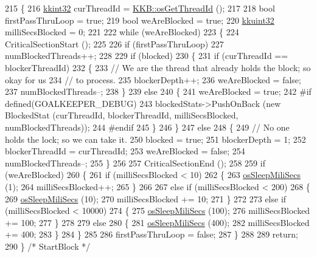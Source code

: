 \begin{DoxyCode}
215 \{
216   \hyperlink{namespace_k_k_b_a8fa4952cc84fda1de4bec1fbdd8d5b1b}{kkint32}  curThreadId = \hyperlink{namespace_k_k_b_aa1d581b15163a41037c43bdbd800d0f8}{KKB::osGetThreadId} ();
217   
218   \textcolor{keywordtype}{bool}    firstPassThruLoop = \textcolor{keyword}{true};
219   \textcolor{keywordtype}{bool}    weAreBlocked      = \textcolor{keyword}{true};
220   \hyperlink{namespace_k_k_b_af8d832f05c54994a1cce25bd5743e19a}{kkuint32}  milliSecsBlocked  = 0;
221 
222   \textcolor{keywordflow}{while}  (weAreBlocked)
223   \{
224     CriticalSectionStart ();
225 
226     \textcolor{keywordflow}{if}  (firstPassThruLoop)
227       numBlockedThreads++;
228 
229     \textcolor{keywordflow}{if}  (blocked)
230     \{
231       \textcolor{keywordflow}{if}  (curThreadId == blockerThreadId)
232       \{
233         \textcolor{comment}{// We are the thread that already holds the block;  so okay for us }
234         \textcolor{comment}{// to process.}
235         blockerDepth++;
236         weAreBlocked = \textcolor{keyword}{false};
237         numBlockedThreads--;
238       \}
239       \textcolor{keywordflow}{else}
240       \{
241         weAreBlocked = \textcolor{keyword}{true};
242 \textcolor{preprocessor}{#if  defined(GOALKEEPER\_DEBUG)}
243         blockedStats->PushOnBack (\textcolor{keyword}{new} BlockedStat (curThreadId, blockerThreadId, milliSecsBlocked, 
      numBlockedThreads));
244 \textcolor{preprocessor}{#endif}
245       \}
246     \}
247     \textcolor{keywordflow}{else}
248     \{
249       \textcolor{comment}{// No one holds the lock;  so we can take it.}
250       blocked = \textcolor{keyword}{true};
251       blockerDepth = 1;
252       blockerThreadId = curThreadId;
253       weAreBlocked = \textcolor{keyword}{false};
254       numBlockedThreads--;
255     \}
256 
257     CriticalSectionEnd ();
258 
259     \textcolor{keywordflow}{if}  (weAreBlocked)
260     \{
261       \textcolor{keywordflow}{if}  (milliSecsBlocked < 10)
262       \{
263         \hyperlink{namespace_k_k_b_a6d3dee6d4727244d65814aaade882c59}{osSleepMiliSecs} (1);
264         milliSecsBlocked++;
265       \}
266 
267       \textcolor{keywordflow}{else} \textcolor{keywordflow}{if}  (milliSecsBlocked < 200)
268       \{
269         \hyperlink{namespace_k_k_b_a6d3dee6d4727244d65814aaade882c59}{osSleepMiliSecs} (10);
270         milliSecsBlocked += 10;
271       \}
272 
273       \textcolor{keywordflow}{else} \textcolor{keywordflow}{if}  (milliSecsBlocked < 10000)
274       \{
275         \hyperlink{namespace_k_k_b_a6d3dee6d4727244d65814aaade882c59}{osSleepMiliSecs} (100);
276         milliSecsBlocked += 100;
277       \}
278 
279       \textcolor{keywordflow}{else}
280       \{
281         \hyperlink{namespace_k_k_b_a6d3dee6d4727244d65814aaade882c59}{osSleepMiliSecs} (400);
282         milliSecsBlocked += 400;
283       \}
284     \}
285 
286     firstPassThruLoop = \textcolor{keyword}{false};
287   \}
288 
289   \textcolor{keywordflow}{return};
290 \}   \textcolor{comment}{/* StartBlock */}
\end{DoxyCode}



